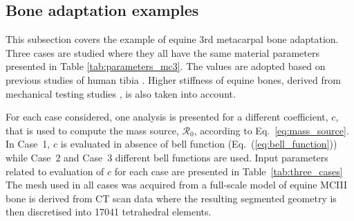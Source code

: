 \documentclass[11pt]{acmeArticle}
\numberwithin{equation}{section}
\begin{document}
\subsection{Bone adaptation examples}
\label{sec:numerical_examples:bone_adap}
This subsection covers the example of equine 3rd metacarpal bone adaptation.
Three cases are studied where they all have the same material parameters presented in Table \ref{tab:parameters_mc3}.
The values are adopted based on previous studies of human tibia \citep{Pang2012,Waffenschmidt2012}. 
Higher stiffness of equine bones, derived from mechanical testing studies \citep{Les1994}, is also taken into account.

For each case considered, one analysis is presented for a different coefficient, $c$, that is used to compute the mass source, $\mathcal{R}_0$, according to Eq.~\ref{eq:mass_source}.
In Case~1, $c$ is evaluated in absence of bell function (Eq.~(\ref{eq:bell_function})) while Case~2 and Case~3 different bell functions are used.
Input parameters related to evaluation of $c$ for each case are presented in Table~\ref{tab:three_cases} 
The mesh used in all cases was acquired from a full-scale model of equine MCIII bone is derived from CT scan data where the resulting segmented geometry is then discretised into 17041 tetrahedral elements.
\end{document}
